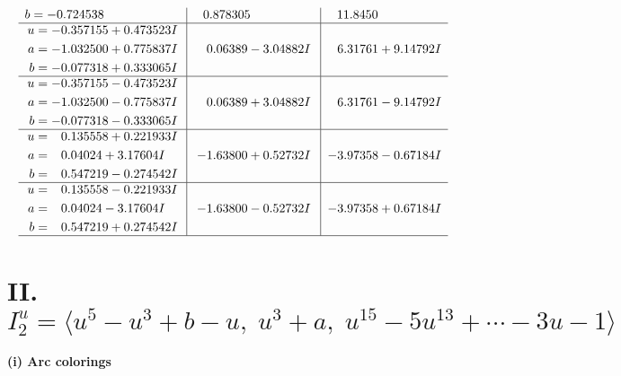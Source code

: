 \documentclass[1p]{elsarticle_modified}
\theoremstyle{definition}
\begin{document}
$$\begin{array}{c|c|c}
\begin{aligned}
b &= -0.724538\phantom{ +0.000000I}\end{aligned}
 & \phantom{-}0.878305\phantom{ +0.000000I} & \phantom{-}11.8450\phantom{ +0.000000I} \\ \hline\begin{aligned}
u &= -0.357155 + 0.473523 I \\
a &= -1.032500 + 0.775837 I \\
b &= -0.077318 + 0.333065 I\end{aligned}
 & \phantom{-}0.06389 - 3.04882 I & \phantom{-}6.31761 + 9.14792 I \\ \hline\begin{aligned}
u &= -0.357155 - 0.473523 I \\
a &= -1.032500 - 0.775837 I \\
b &= -0.077318 - 0.333065 I\end{aligned}
 & \phantom{-}0.06389 + 3.04882 I & \phantom{-}6.31761 - 9.14792 I \\ \hline\begin{aligned}
u &= \phantom{-}0.135558 + 0.221933 I \\
a &= \phantom{-}0.04024 + 3.17604 I \\
b &= \phantom{-}0.547219 - 0.274542 I\end{aligned}
 & -1.63800 + 0.52732 I & -3.97358 - 0.67184 I \\ \hline\begin{aligned}
u &= \phantom{-}0.135558 - 0.221933 I \\
a &= \phantom{-}0.04024 - 3.17604 I \\
b &= \phantom{-}0.547219 + 0.274542 I\end{aligned}
 & -1.63800 - 0.52732 I & -3.97358 + 0.67184 I\\
 \hline 
 \end{array}$$\newpage\newpage\renewcommand{\arraystretch}{1}
\centering \section*{II. $I^u_{2}= \langle u^5- u^3+b- u,\;u^3+a,\;u^{15}-5 u^{13}+\cdots-3 u-1 \rangle$}
\flushleft \textbf{(i) Arc colorings}\\
\end{document}
